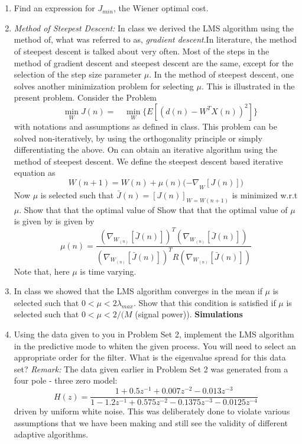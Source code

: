 \documentclass[journal,12pt,twocolumn]{IEEEtran}
\begin{document}
\section{}
\begin{enumerate}
\item Find an expression for $J_{min}$, the Wiener optimal cost.
%
\item \textit{Method of Steepest Descent:}
%
In class we derived the LMS algorithm using the method of, what was referred to as, \textit{gradient descent}.In literature, the method of steepest descent is talked about very often. Most of the steps in the method of gradient descent and steepest descent are the same, except for the selection of the step size parameter $\mu $. In the method of steepest descent, one solves another minimization problem for selecting $ \mu.$ This is illustrated in the present problem.
%
Consider the Problem
$$\quad\min_W{J(n)}=\quad\min_W\{E[(d(n)-W^TX(n))^2]\}$$
%
with notations and assumptions as defined in class. This problem can be solved non-iteratively, by using the orthogonality principle or simply differentiating the above. On can obtain an iterative algorithm using the method of steepest descent. We define the steepest descent based iterative equation as
$$W(n+1)=W(n)+\mu(n){(-\nabla}_W[J(n)])$$
%
Now $\mu$ is selected such that $\bar{J}(n)=[J(n)]_{W=W(n+1 )}$ is minimized w.r.t $\mu.$ Show that that the optimal value of Show that that the optimal value of $\mu$ is given by is given by
$$\mu(n)=\frac{(\nabla_{W_{(n)}}[\bar{J}(n)])^T(\nabla_{W_{(n)}}[\bar{J}(n)])}{(\nabla_{W_{(n)}}[\bar{J}(n)])^TR(\nabla_{W_{(n)}}[\bar{J}{(n)}])} $$
%
Note that, here $\mu $ is time varying.
%
\item In class we showed that the LMS algorithm converges in the mean if $\mu $ is selected such that $0<\mu <2{\lambda}_{max}.$ 
Show that this condition is satisfied if $\mu$ is selected such that $0 < \mu < 2/(M$ (signal power)).
% 	
\textbf{Simulations}
%
\item Using the data given to you in Problem Set 2, implement the LMS algorithm in the predictive mode to whiten the given process. You will need to select an appropriate order for the filter.
What is the eigenvalue spread for this data set?
\textit{Remark:}
The data given earlier in Problem Set 2 was generated from a four pole - three zero model:
$$H(z)= \frac{1+{0.5z^{-1}}+0.007z^{-2}-0.013z^{-3}}{1-1.2z^{-1}+0.575z^{-2}-0.1375z^{-3}-0.0125z^{-4}}$$
driven by uniform white noise. This was deliberately done to violate various assumptions that we have been making and still see the validity of different adaptive algorithms.

\end{enumerate}
\end{document}

